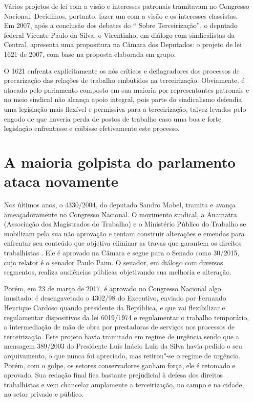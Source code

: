Vários projetos de lei com a visão e interesses patronais tramitavam no
Congresso Nacional. Decidimos, portanto, fazer um com a visão e os
interesses classistas. Em 2007, após a conclusão dos debates do ``
Sobre Terceirização'', o deputado federal Vicente Paulo da Silva, o
Vicentinho, em diálogo com sindicalistas da Central, apresenta uma
propositura na Câmara dos Deputados: o projeto de lei 1621 de 2007, com
base na proposta elaborada em grupo.

O  1621 enfrenta explicitamente os nós críticos e deflagradores dos
processos de precarização das relações de trabalho embutidos na
terceirização. Obviamente, é atacado pelo parlamento composto em sua
maioria por representantes patronais e no meio sindical não alcança
apoio integral, pois parte do sindicalismo defendia uma legislação mais
flexível e permissiva para a terceirização, talvez levados pelo engodo
de que haveria perda de postos de trabalho caso uma boa e forte
legislação enfrentasse e coibisse efetivamente este processo.

\section{A maioria golpista do parlamento ataca novamente}

Nos últimos anos, o  4330/2004, do deputado Sandro Mabel, tramita e
avança ameaçadoramente no Congresso Nacional. O movimento sindical, a
Anamatra (Associação dos Magistrados do Trabalho) e o Ministério Público
do Trabalho se mobilizam pela sua não aprovação e tentam construir
alterações e emendas para enfrentar seu conteúdo que objetiva eliminar
as travas que garantem os direitos trabalhistas . Ele é aprovado na
Câmara e segue para o Senado como 30/2015, cujo relator é o senador
Paulo Paim. O senador, em diálogo com diversos segmentos, realiza
audiências públicas objetivando sua melhoria e alteração.

Porém, em 23 de março de 2017, é aprovado no Congresso Nacional algo
inusitado: é desengavetado o  4302/98 do Executivo, enviado por
Fernando Henrique Cardoso quando presidente da República, e que vai
flexibilizar e regulamentar dispositivos da lei 6019/1974 e regulamentar
o trabalho temporário, a intermediação de mão de obra por prestadoras de
serviços nos processos de terceirização. Este projeto havia tramitado em
regime de urgência sendo que a mensagem 389/2003 do Presidente Luís
Inácio Lula da Silva havia pedido o seu arquivamento, o que nunca foi
apreciado, mas retirou"-se o regime de urgência. Porém, com o golpe, os
setores conservadores ganham força, ele é retomado e aprovado. Sua
redação final fica bastante prejudicial à defesa dos direitos
trabalhistas e vem chancelar amplamente a terceirização, no campo e na
cidade, no setor privado e público.

